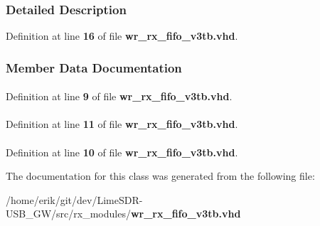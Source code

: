 \subsubsection{Detailed Description}


Definition at line {\bf 16} of file {\bf wr\+\_\+rx\+\_\+fifo\+\_\+v3tb.\+vhd}.



\subsubsection{Member Data Documentation}
\paragraph[{ieee}]{\hspace{0.3cm}{\ttfamily [Library]}}\label{classwr__rx__fifo__v3tb_a0a6af6eef40212dbaf130d57ce711256}


Definition at line {\bf 9} of file {\bf wr\+\_\+rx\+\_\+fifo\+\_\+v3tb.\+vhd}.

\paragraph[{numeric\+\_\+std}]{\hspace{0.3cm}{\ttfamily [Package]}}\label{classwr__rx__fifo__v3tb_a2edc34402b573437d5f25fa90ba4013e}


Definition at line {\bf 11} of file {\bf wr\+\_\+rx\+\_\+fifo\+\_\+v3tb.\+vhd}.

\paragraph[{std\+\_\+logic\+\_\+1164}]{\hspace{0.3cm}{\ttfamily [Package]}}\label{classwr__rx__fifo__v3tb_acd03516902501cd1c7296a98e22c6fcb}


Definition at line {\bf 10} of file {\bf wr\+\_\+rx\+\_\+fifo\+\_\+v3tb.\+vhd}.



The documentation for this class was generated from the following file\+:\begin{DoxyCompactItemize}
\item 
/home/erik/git/dev/\+Lime\+S\+D\+R-\/\+U\+S\+B\+\_\+\+G\+W/src/rx\+\_\+modules/{\bf wr\+\_\+rx\+\_\+fifo\+\_\+v3tb.\+vhd}\end{DoxyCompactItemize}
